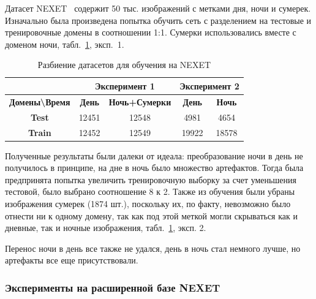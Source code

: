 \documentclass[11pt,a4paper]{extarticle}
\begin{document}
{			Датасет NEXET~\cite{data:nexet} содержит 50 тыс. изображений с метками дня, ночи и сумерек.
			Изначально была произведена попытка обучить сеть с разделением на тестовые и тренировочные домены в соотношении 1:1.
			Сумерки использовались вместе с доменом ночи, табл.~\ref{tab:tests:nexet}, эксп.~1.
			\begin{table}[ht]
				\centering
				\begin{tabular}{|c|c|c|c|c|}
				\hline
				\rowcolor[HTML]{EFEFEF} 
				\multicolumn{1}{|l|}{\cellcolor[HTML]{EFEFEF}} & \multicolumn{2}{c|}{\cellcolor[HTML]{EFEFEF}\textbf{Эксперимент 1}} & \multicolumn{2}{c|}{\cellcolor[HTML]{EFEFEF}\textbf{Эксперимент 2}} \\ \hline
				\rowcolor[HTML]{EFEFEF} 
				\textbf{Домены\textbackslash{}Время}           & \textbf{День}                & \textbf{Ночь+Сумерки}                & \textbf{День}                    & \textbf{Ночь}                    \\ \hline
				\cellcolor[HTML]{EFEFEF}\textbf{Test}          & 12451                        & 12548                                & 4981                             & 4654                             \\ \hline
				\cellcolor[HTML]{EFEFEF}\textbf{Train}         & 12452                        & 12549                                & 19922                            & 18578                            \\ \hline
				\end{tabular}
				\caption{Разбиение датасетов для обучения на NEXET}
				\label{tab:tests:nexet}
			\end{table}

			Полученные результаты были далеки от идеала: преобразование ночи в день не получилось в принципе, на дне в ночь было множество артефактов.
			Тогда была предпринята попытка увеличить тренировочную выборку за счет уменьшения тестовой, было выбрано соотношение 8 к 2. 
			Также из обучения были убраны изображения сумерек (1874 шт.), поскольку их, по факту, невозможно было отнести ни к одному домену, так как под этой меткой могли скрываться как и дневные, так и ночные изображения, табл.~\ref{tab:tests:nexet}, эксп. 2.  
			
			Перенос ночи в день все также не удался, день в ночь стал немного лучше, но артефакты все еще присутствовали.

		\subsubsection{Эксперименты на расширенной базе NEXET}\label{sec:tests:nexet_ext}
			
}
\end{document}
